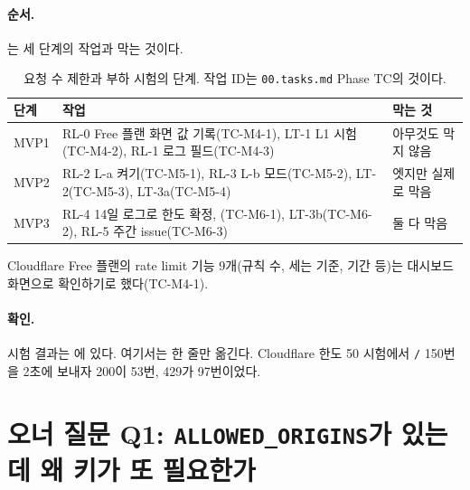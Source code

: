\paragraph{순서.}
는 세 단계의 작업과 막는 것이다.

\begin{table}[H]
  \caption{요청 수 제한과 부하 시험의 단계. 작업 ID는 \texttt{00.tasks.md} Phase TC의 것이다.}
  \label{tab:bl-mvp}
  \centering\footnotesize
  \begin{tabularx}{\linewidth}{@{}L{1.4cm}Y L{3.0cm}@{}}
    \toprule
    단계 & 작업 & 막는 것 \\
    \midrule
    MVP1 & RL-0 Free 플랜 화면 값 기록(TC-M4-1), LT-1 L1 시험(TC-M4-2), RL-1 로그 필드(TC-M4-3) & 아무것도 막지 않음 \\
    \midrule
    MVP2 & RL-2 L-a 켜기(TC-M5-1), RL-3 L-b  모드(TC-M5-2), LT-2(TC-M5-3), LT-3a(TC-M5-4) & 엣지만 실제로 막음 \\
    \midrule
    MVP3 & RL-4 14일 로그로 한도 확정, (TC-M6-1), LT-3b(TC-M6-2), RL-5 주간 issue(TC-M6-3) & 둘 다 막음 \\
    \bottomrule
  \end{tabularx}
\end{table}

\begin{callout}[확인 못 한 것]
Cloudflare Free 플랜의 rate limit 기능 9개(규칙 수, 세는 기준, 기간 등)는 대시보드 화면으로 확인하기로 했다(TC-M4-1).
\end{callout}

\paragraph{확인.}
시험 결과는 에 있다.
여기서는 한 줄만 옮긴다.
Cloudflare 한도 50 시험에서 \texttt{/} 150번을 2초에 보내자 200이 53번, 429가 97번이었다.

\section{오너 질문 Q1: \texttt{ALLOWED\_ORIGINS}가 있는데 왜 키가 또 필요한가}\label{sec:bl-q1}

